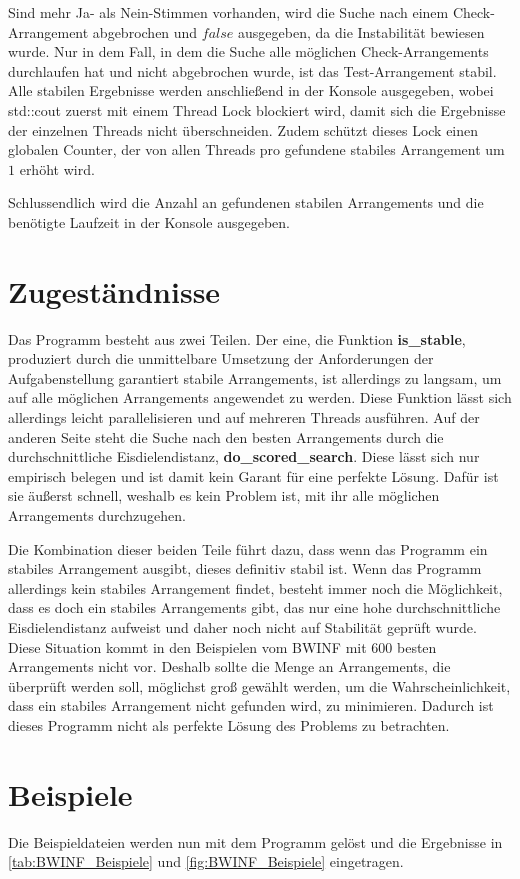 \documentclass[a4paper,10pt,ngerman,captions=figureheading]{scrartcl}
\begin{document}
\medskip
Sind mehr Ja- als Nein-Stimmen vorhanden, wird die Suche nach einem Check-Arrangement abgebrochen und $false$ ausgegeben, da die Instabilität bewiesen wurde.
Nur in dem Fall, in dem die Suche alle möglichen Check-Arrangements durchlaufen hat und nicht abgebrochen wurde, ist das Test-Arrangement stabil.
Alle stabilen Ergebnisse werden anschließend in der Konsole ausgegeben, wobei std::cout zuerst mit einem Thread Lock blockiert wird, damit sich die Ergebnisse der einzelnen Threads nicht überschneiden.
Zudem schützt dieses Lock einen globalen Counter, der von allen Threads pro gefundene stabiles Arrangement um $1$ erhöht wird.

\medskip
Schlussendlich wird die Anzahl an gefundenen stabilen Arrangements und die benötigte Laufzeit in der Konsole ausgegeben.

\section{Zugeständnisse}
Das Programm besteht aus zwei Teilen.
Der eine, die Funktion \textbf{is\_stable}, produziert durch die unmittelbare Umsetzung der Anforderungen der Aufgabenstellung garantiert stabile Arrangements, ist allerdings zu langsam, um auf alle möglichen Arrangements angewendet zu werden.
Diese Funktion lässt sich allerdings leicht parallelisieren und auf mehreren Threads ausführen.
Auf der anderen Seite steht die Suche nach den besten Arrangements durch die durchschnittliche Eisdielendistanz, \textbf{do\_scored\_search}.
Diese lässt sich nur empirisch belegen und ist damit kein Garant für eine perfekte Lösung.
Dafür ist sie äußerst schnell, weshalb es kein Problem ist, mit ihr alle möglichen Arrangements durchzugehen.

Die Kombination dieser beiden Teile führt dazu, dass wenn das Programm ein stabiles Arrangement ausgibt, dieses definitiv stabil ist.
Wenn das Programm allerdings kein stabiles Arrangement findet, besteht immer noch die Möglichkeit, dass es doch ein stabiles Arrangements gibt, das nur eine hohe durchschnittliche Eisdielendistanz aufweist und daher noch nicht auf Stabilität geprüft wurde.
Diese Situation kommt in den Beispielen vom BWINF mit $600$ besten Arrangements nicht vor.
Deshalb sollte die Menge an Arrangements, die überprüft werden soll, möglichst groß gewählt werden, um die Wahrscheinlichkeit, dass ein stabiles Arrangement nicht gefunden wird, zu minimieren.
Dadurch ist dieses Programm nicht als perfekte Lösung des Problems zu betrachten.

\section{Beispiele}
Die Beispieldateien werden nun mit dem Programm gelöst und die Ergebnisse in \autoref{tab:BWINF_Beispiele} und \autoref{fig:BWINF_Beispiele} eingetragen.
\end{document}
